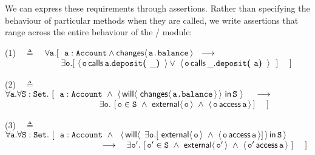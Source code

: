  
We can  express these  requirements  %
through \Chainmail assertions.  Rather than %
specifying the behaviour of particular methods when they are called, we
write  assertions   that range across the entire behaviour of the
/  module: %
\vspace{.2cm}


(1)\ \  $\triangleq$\ \ $\forall \prg{a}.[\ \ \prg{a}:\prg{Account} \wedge \Changes{\prg{a.balance}}  \ \    
    \longrightarrow \ \    \hfill$ \\
  $\strut \hspace{2.3cm} 
  \exists \prg{o}. [\    \Calls{\prg{o}}{\prg{deposit}}{\prg{a}}{\_} \vee\  \Calls{\prg{o}}{\prg{deposit}}{\_}{\prg{a}}\  \ ] \ \ \ \ ] \hfill $

\vspace{.4cm}

    (2)\ \  $\triangleq$\ \ $\forall {\mbox{\tt{a}}}.\forall {\mbox{\tt{S}}}:{\mbox{\tt{Set}}}.\ [  \ \  {\mbox{\tt{a}}}:{\mbox{\tt{Account}}}\ \wedge \  \langle\,  {\mathsf{will}}\langle \,\,{\mathsf{changes}}\langle\,{\mbox{\tt{a.balance}}}\,\rangle\,\rangle \,\, \mathsf{in}\, {\mbox{\tt{S}}}\,\, \rangle\ \ \   \
    \longrightarrow$ \\
 $\strut \hspace{3.9cm} \hfill \exists \prg{o}.\ [\, \prg{o}\in \prg{S}\ \wedge\  \External{\prg{o}}  \ \wedge \ \CanAccess{\prg{o}}{\prg{a}} \, ] \ \ \ \ ]$
\vspace{.4cm} 
 
     (3)\ \  $\triangleq$\ \ $\forall {\mbox{\tt{a}}}.\forall {\mbox{\tt{S}}}:{\mbox{\tt{Set}}}.\ [ \ \  {\mbox{\tt{a}}}:{\mbox{\tt{Account}}}\ \wedge \ \ {\langle\, {\mathsf{will}}\langle \,\ \exists {\mbox{\tt{o}}}.[\ {\mathsf{external}}\langle\, {\mbox{\tt{o}}}\, \rangle \ \wedge\ \langle\, {\mbox{\tt{o}}}\, \mathsf{access}\, {\mbox{\tt{a}}}\, \rangle]\,\rangle\, \mathsf{in}\, {{\mbox{\tt{S}}}}\, \rangle}$ \\  
 $\strut \hspace{3.9cm} \hfill   \longrightarrow \ \ \ \exists \prg{o}'.\ [\, \prg{o}'\in \prg{S}\  \wedge  \ \External{\prg{o}'}  \ \wedge \ \CanAccess{\prg{o}'}{\prg{a}}   \ ] \ \ \ \ ]$

\vspace{.2cm}

